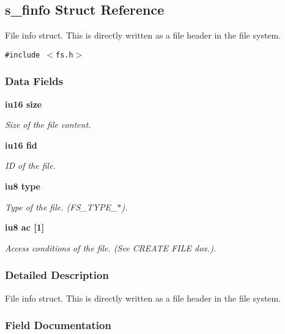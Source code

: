 \subsection{s\_\-finfo Struct Reference}
\label{structs__finfo}
File info struct. This is directly written as a file header in the file system.  


{\tt \#include $<$fs.h$>$}

\subsubsection*{Data Fields}
\begin{CompactItemize}
\item 
\bf{iu16} \bf{size}
\begin{CompactList}\small\item\em Size of the file content. \item\end{CompactList}\item 
\bf{iu16} \bf{fid}
\begin{CompactList}\small\item\em ID of the file. \item\end{CompactList}\item 
\bf{iu8} \bf{type}
\begin{CompactList}\small\item\em Type of the file. (FS\_\-TYPE\_\-$\ast$). \item\end{CompactList}\item 
\bf{iu8} \bf{ac} [1]
\begin{CompactList}\small\item\em Access conditions of the file. (See CREATE FILE dox.). \item\end{CompactList}\end{CompactItemize}


\subsubsection{Detailed Description}
File info struct. This is directly written as a file header in the file system. 



\subsubsection{Field Documentation}
